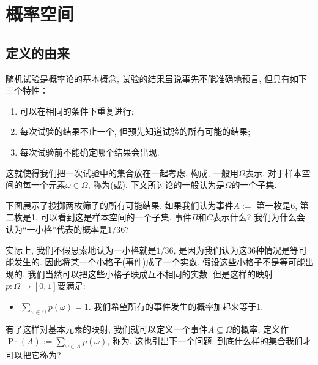 \documentclass{ctexart}
\begin{document}
\section{概率空间}

\subsection{定义的由来}

随机试验是概率论的基本概念, 试验的结果虽说事先不能准确地预言, 但具有如下三个特性：

\begin{enumerate}
    \item 可以在相同的条件下重复进行;
    \item 每次试验的结果不止一个, 但预先知道试验的所有可能的结果;
    \item 每次试验前不能确定哪个结果会出现.
\end{enumerate}

这就使得我们把一次试验中的集合放在一起考虑. 构成, 一般用$\Omega$表示. 对于样本空间的每一个元素$\omega\in \Omega$, 称为(或). 下文所讨论的一般认为是$\Omega$的一个子集. 

\begin{example}
    下图展示了投掷两枚筛子的所有可能结果. 如果我们认为事件$A:=$ 第一枚是6, 第二枚是1, 可以看到这是样本空间的一个子集. 事件$B$和$C$表示什么? 我们为什么会认为``一小格''代表的概率是$1/36$?

\end{example}

实际上, 我们不假思索地认为一小格就是$1/36$, 是因为我们认为这36种情况是等可能发生的. 因此将某一个小格子(事件)成了一个实数. 假设这些小格子不是等可能出现的, 我们当然可以把这些小格子映成互不相同的实数. 但是这样的映射$p:\Omega\to [0,1]$要满足:

\begin{itemize}
    \item $\sum_{\omega \in \Omega} p(\omega)=1$. 我们希望所有的事件发生的概率加起来等于1. 
\end{itemize}

有了这样对基本元素的映射, 我们就可以定义一个事件$A \subseteq \Omega$的概率, 定义作$\operatorname{Pr}(A):=\sum_{\omega \in A} p(\omega)$, 称为. 这也引出下一个问题: 到底什么样的集合我们才可以把它称为?
\end{document}
